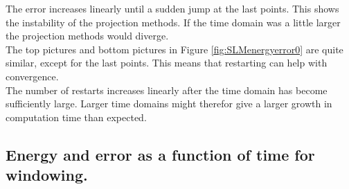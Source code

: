 \noindent The error increases linearly until a sudden jump at the last points. This shows the instability of the projection methods. If the time domain was a little larger the projection methods would diverge. \\


\noindent The top pictures and bottom pictures in Figure \ref{fig:SLMenergyerror0} are quite similar, except for the last points. This means that restarting can help with convergence. \\ %

\noindent The number of restarts increases linearly after the time domain has become sufficiently large. Larger time domains might therefor give a larger growth in computation time than expected. \\
\subsection{Energy and error as a function of time for windowing.} %


